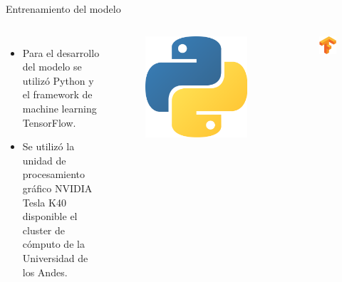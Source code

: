 \documentclass[12pt,aspectratio=169]{beamer}
\begin{document}
\begin{frame}{Entrenamiento del modelo}

    \begin{columns}[c] 
            \begin{itemize}
                \item Para el desarrollo del modelo se utilizó Python y el framework de machine learning TensorFlow.
                \vspace{8mm}
                \item Se utilizó la unidad de procesamiento gráfico NVIDIA Tesla K40 disponible el cluster de cómputo de la Universidad de los Andes.
            \end{itemize}
            \begin{figure}
                \includegraphics[scale=0.04]{figs/python}
            \end{figure}
            \vspace*{-4mm}
            \begin{figure}
                \includegraphics[scale=0.3]{figs/tensorflow.png}

\end{figure}
\end{columns}
\end{frame}
\end{document}
